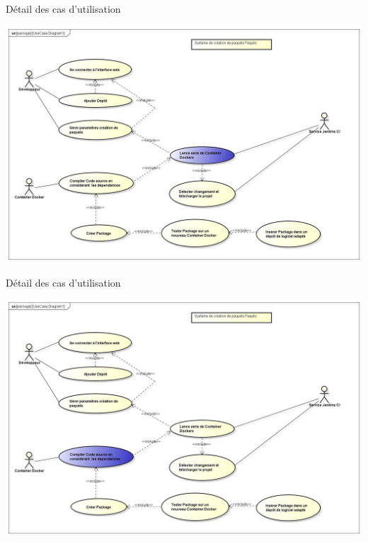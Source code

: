 \documentclass[11pt,xcolor=dvipsnames]{beamer}
\begin{document}
\begin{frame}{Détail des cas d'utilisation}
	\begin{center}	
		\includegraphics[scale=\largeur]{../img/Diagram6.jpg}
	\end{center}
\end{frame}

\begin{frame}{Détail des cas d'utilisation}
	\begin{center}	
		\includegraphics[scale=\largeur]{../img/Diagram7.jpg}
	\end{center}
\end{frame}
\end{document}
